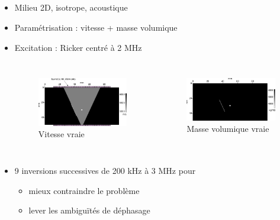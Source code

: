 \documentclass[10pt,xcolor=x11names,compress, notes=show]{beamer}%
\begin{document}
\subsection*{}
\begin{frame}{\insertsectionhead}
	\begin{itemize}
		\item Milieu 2D, isotrope, acoustique
		\item Paramétrisation : vitesse + masse volumique
		\item Excitation : Ricker centré à 2 MHz 
	\begin{columns}
		\begin{figure}
			\includegraphics[width=\textwidth]{img/vp_true.png}\\
			{\small Vitesse vraie}
		\end{figure}
		\begin{figure}
			\includegraphics[width=\textwidth]{img/rho_true.png}\\
			{\small Masse volumique vraie}
		\end{figure}
	\end{columns}
	\vspace{1cm}
		\item 9 inversions successives de 200 kHz à 3 MHz pour
			\begin{itemize}
				\item mieux contraindre le problème
				\item lever les ambiguïtés de déphasage 
			\end{itemize}
	\end{itemize}

\end{frame}
\end{document}

